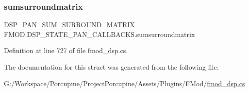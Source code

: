 \subsubsection{\texorpdfstring{sumsurroundmatrix}{sumsurroundmatrix}}
{\footnotesize\ttfamily \hyperlink{namespace_f_m_o_d_a9dda121ba9ef7b93f94aae821fafc709}{D\+S\+P\+\_\+\+P\+A\+N\+\_\+\+S\+U\+M\+\_\+\+S\+U\+R\+R\+O\+U\+N\+D\+\_\+\+M\+A\+T\+R\+IX} F\+M\+O\+D.\+D\+S\+P\+\_\+\+S\+T\+A\+T\+E\+\_\+\+P\+A\+N\+\_\+\+C\+A\+L\+L\+B\+A\+C\+K\+S.\+sumsurroundmatrix}



Definition at line 727 of file fmod\+\_\+dsp.\+cs.



The documentation for this struct was generated from the following file\+:\begin{DoxyCompactItemize}
\item 
G\+:/\+Workspace/\+Porcupine/\+Project\+Porcupine/\+Assets/\+Plugins/\+F\+Mod/\hyperlink{fmod__dsp_8cs}{fmod\+\_\+dsp.\+cs}\end{DoxyCompactItemize}
